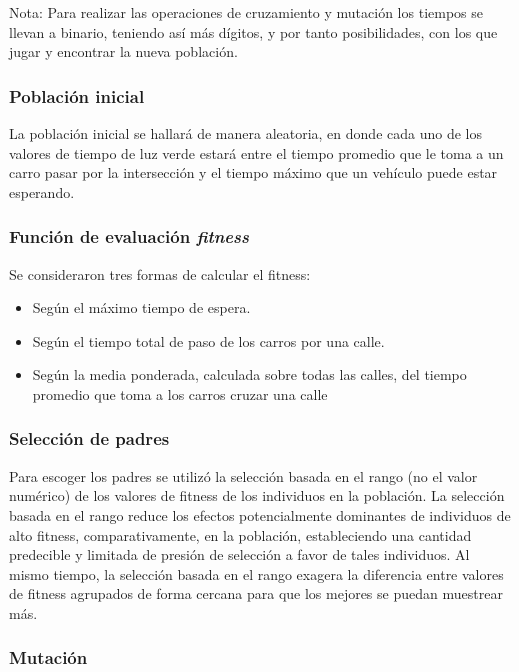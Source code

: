 \documentclass[twoside,twocolumn]{article} %
\begin{document}
		Nota: Para realizar las operaciones de cruzamiento y mutaci\'on los tiempos se llevan a binario, teniendo as\'i m\'as d\'igitos, y por tanto posibilidades, con los que jugar y encontrar la nueva poblaci\'on.
		
		\subsubsection{Población inicial}
		
		La población inicial se hallará de manera aleatoria, en donde cada uno de los valores de tiempo de luz verde estará entre el tiempo promedio que le toma a un carro pasar por la intersección y el tiempo máximo que un vehículo puede estar esperando. 
		
		\subsubsection{Función de evaluación \textit{fitness}}
		
		Se consideraron tres formas de calcular el fitness:
		\begin{itemize}
			\item Seg\'un el m\'aximo tiempo de espera. 
			\item Seg\'un el tiempo total de paso de los carros por una calle. 
			\item Seg\'un la media ponderada, calculada sobre todas las calles, del tiempo promedio que toma a los carros cruzar una calle
		\end{itemize}
	
		\subsubsection{Selección de padres}
		
		Para escoger los padres se utiliz\'o la selección basada en el rango (no el valor numérico) de los valores de fitness de los individuos en la población. La selección basada en el rango reduce los efectos potencialmente dominantes de individuos de alto fitness, comparativamente, en la población, estableciendo una cantidad predecible y limitada de presión de selección a favor de tales individuos. Al mismo tiempo, la selección basada en el rango exagera la diferencia entre valores de fitness agrupados de forma cercana para que los mejores se puedan muestrear más.
		
		\subsubsection{Mutación}
		
\end{document}
